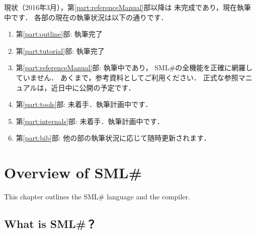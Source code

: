 \documentclass{jbook}
\newif\ifjp
\newcommand{\txt}[2]{#2}
\newcommand{\smlsharp}{SML\#}
\newcommand{\version}{3.0.0}
\begin{document}
	現状（2016年3月），第\ref{part:referenceManual}部以降は
未完成であり，現在執筆中です．
	各部の現在の執筆状況は以下の通りです．
\begin{enumerate}
\item
	第\ref{part:outline}部: 執筆完了
\item
	第\ref{part:tutorial}部: 執筆完了
\item
	第\ref{part:referenceManual}部: 執筆中であり，
\smlsharp{}の全機能を正確に網羅していません．
	あくまで，参考資料としてご利用ください．
	正式な参照マニュアルは，近日中に公開の予定です．
\item
	第\ref{part:tools}部: 未着手．執筆計画中です．
\item
	第\ref{part:internals}部: 未着手．執筆計画中です．
\item
	第\ref{part:bib}部: 他の部の執筆状況に応じて随時更新されます．
\end{enumerate}

%
%
%
%

\chapter{\txt{\smlsharp{}の概要}{Overview of \smlsharp{}}}
\label{chap:intro}

\ifjp%
本章では\smlsharp{}言語の概要を説明します．
\else%
This chapter outlines the \smlsharp{} language and the compiler.
\fi%

\section{\txt{\smlsharp{}とは？}{What is \smlsharp{}？}}
\label{sec:whatIsSmlsharp}
\ifjp%
\end{document}
